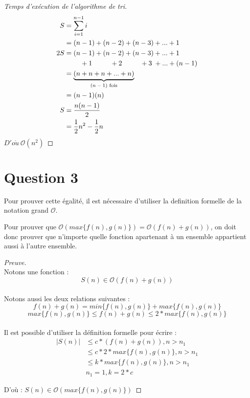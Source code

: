 \documentclass[12pt]{article}
\begin{document}
    \begin{proof}[Temps d'exécution de l'algorithme de tri]
      \begin{align*}
        S   &= \sum _ {i=1} ^ {n - 1} i \\
            &= (n - 1) + (n - 2) + (n - 3) + ... + 1 \\
        2S  &= (n - 1) + (n - 2) + (n - 3) + ... + 1 \\
            &\qquad\,\, + 1 \qquad\;\:\, + 2 \qquad\;\:\, + 3 \;+ ... + (n - 1) \\
            &= \underbrace{(n + n + n + ... + n)}_\textrm{\( (n - 1) \) fois} \\
            &= (n - 1)(n) \\
        S   &= \frac{n(n - 1)}{2} \\
            &= \frac{1}{2}n^2 - \frac{1}{2}n
      \end{align*}
      \( D'o\grave{u} \ \mathcal{O}(n^2) \)
    \end{proof}

  \newpage

  \section*{Question 3}
  Pour prouver cette égalité, il est nécessaire d'utiliser la definition
  formelle de la notation grand \( \mathcal{O} \). \newline

  \noindent Pour prouver que
  \( \mathcal{O}({max\{f(n), g(n)\}}) = \mathcal{O}(f(n) + g(n)) \), on doit
  donc prouver que n'importe quelle fonction apartenant à un ensemble appartient
  aussi à l'autre ensemble. \\

  \begin{proof}[Preuve]
    \noindent \\ Notons une fonction : \[ S(n) \in \mathcal{O}(f(n) + g(n)) \] \\

    \noindent Notons aussi les deux relations suivantes :
    \[ f(n) + g(n) = min\{f(n), g(n)\} + max\{f(n), g(n)\} \]
    \[ max\{f(n), g(n)\} \leq f(n) + g(n) \leq 2 * max\{f(n), g(n)\} \] \\

    \noindent Il est possible d'utiliser la définition formelle pour écrire :
    \begin{align*}
      | S(n) |  &\leq c * (f(n) + g(n)), n > n_1 \\
                &\leq c * 2 * max\{f(n), g(n)\}, n > n_1 \\
                &\leq k * max\{f(n), g(n)\}, n > n_1 \\
                & n_1 = 1, k = 2 * c
    \end{align*}

    \noindent D'où :
    \( S(n) \in \mathcal{O}({max\{f(n), g(n)\}})\)
  \end{proof}
\end{document}
